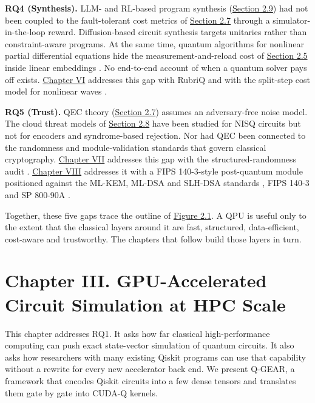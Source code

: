\documentclass{report}
\theoremstyle{plain}
\theoremstyle{definition}
\theoremstyle{remark}
\begin{document}
\textbf{RQ4 (Synthesis).} LLM- and RL-based program synthesis (\hyperref[sec:bg:llm]{Section 2.9}) had not been coupled to the fault-tolerant cost metrics of \hyperref[sec:bg:qec]{Section 2.7} through a simulator-in-the-loop reward. Diffusion-based circuit synthesis targets unitaries rather than constraint-aware programs. At the same time, quantum algorithms for nonlinear partial differential equations hide the measurement-and-reload cost of \hyperref[sec:bg:encoding]{Section 2.5} inside linear embeddings \cite{jin2024schrodingerization}. No end-to-end account of when a quantum solver pays off exists. \hyperref[ch:synthesis]{Chapter VI} addresses this gap with RubriQ \cite{guo2026rubriq,guo2026rubriqsoftware} and with the split-step cost model for nonlinear waves \cite{guo2026nonlinearwaves,guo2026splitstepqude}.

\textbf{RQ5 (Trust).} QEC theory (\hyperref[sec:bg:qec]{Section 2.7}) assumes an adversary-free noise model. The cloud threat models of \hyperref[sec:bg:crypto]{Section 2.8} have been studied for NISQ circuits but not for encoders and syndrome-based rejection. Nor had QEC been connected to the randomness and module-validation standards that govern classical cryptography. \hyperref[ch:qec]{Chapter VII} addresses this gap with the structured-randomness audit \cite{guo2026qecaudit}. \hyperref[ch:pqc]{Chapter VIII} addresses it with a FIPS 140-3-style post-quantum module \cite{guo2026lightriderqpc} positioned against the ML-KEM, ML-DSA and SLH-DSA standards \cite{nist2024fips203,nist2024fips204,nist2024fips205}, FIPS 140-3 \cite{nist2019fips1403} and SP 800-90A \cite{nist2015sp80090a}.

Together, these five gaps trace the outline of \hyperref[fig:bg:stack]{Figure 2.1}. A QPU is useful only to the extent that the classical layers around it are fast, structured, data-efficient, cost-aware and trustworthy. The chapters that follow build those layers in turn.


\chapter{Chapter III. GPU-Accelerated Circuit Simulation at HPC Scale}\label{ch:qgear}

This chapter addresses RQ1. It asks how far classical high-performance computing can push exact state-vector simulation of quantum circuits. It also asks how researchers with many existing Qiskit programs can use that capability without a rewrite for every new accelerator back end. We present Q-GEAR, a framework that encodes Qiskit circuits into a few dense tensors and translates them gate by gate into CUDA-Q kernels.
\end{document}
